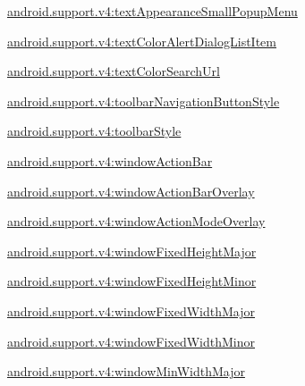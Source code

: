 {\ttfamily \hyperlink{classandroid_1_1support_1_1v4_1_1R_1_1styleable_a75e7751d6580449963f139fd3c4efd52}{android.\+support.\+v4\+:text\+Appearance\+Small\+Popup\+Menu}}

{\ttfamily \hyperlink{classandroid_1_1support_1_1v4_1_1R_1_1styleable_a635d1d4e8c44021e9a86c648aa1353ac}{android.\+support.\+v4\+:text\+Color\+Alert\+Dialog\+List\+Item}}

{\ttfamily \hyperlink{classandroid_1_1support_1_1v4_1_1R_1_1styleable_af247dbb00ad2d383e2bbe1ed27fd7304}{android.\+support.\+v4\+:text\+Color\+Search\+Url}}

{\ttfamily \hyperlink{classandroid_1_1support_1_1v4_1_1R_1_1styleable_aa8e0c46e553d29574374131334849630}{android.\+support.\+v4\+:toolbar\+Navigation\+Button\+Style}}

{\ttfamily \hyperlink{classandroid_1_1support_1_1v4_1_1R_1_1styleable_add96349c4e4f3a9c0e641cbdfe385992}{android.\+support.\+v4\+:toolbar\+Style}}

{\ttfamily \hyperlink{classandroid_1_1support_1_1v4_1_1R_1_1styleable_a13120c866ad32e1b4339a93a131463d6}{android.\+support.\+v4\+:window\+Action\+Bar}}

{\ttfamily \hyperlink{classandroid_1_1support_1_1v4_1_1R_1_1styleable_a35dd6a281168ca4263f3a47afa038b5a}{android.\+support.\+v4\+:window\+Action\+Bar\+Overlay}}

{\ttfamily \hyperlink{classandroid_1_1support_1_1v4_1_1R_1_1styleable_a90589f30809f60bc8783dde73bb5e9f1}{android.\+support.\+v4\+:window\+Action\+Mode\+Overlay}}

{\ttfamily \hyperlink{classandroid_1_1support_1_1v4_1_1R_1_1styleable_aaa685f805f4181374a8047b1ce8935b5}{android.\+support.\+v4\+:window\+Fixed\+Height\+Major}}

{\ttfamily \hyperlink{classandroid_1_1support_1_1v4_1_1R_1_1styleable_a8406ab28fcb798abe69bcc846a2e8a7d}{android.\+support.\+v4\+:window\+Fixed\+Height\+Minor}}

{\ttfamily \hyperlink{classandroid_1_1support_1_1v4_1_1R_1_1styleable_aeb98c393e76d842baf26189afd20c945}{android.\+support.\+v4\+:window\+Fixed\+Width\+Major}}

{\ttfamily \hyperlink{classandroid_1_1support_1_1v4_1_1R_1_1styleable_af5b499ea473560087fcc1a5241132837}{android.\+support.\+v4\+:window\+Fixed\+Width\+Minor}}

{\ttfamily \hyperlink{classandroid_1_1support_1_1v4_1_1R_1_1styleable_a5645adca1e8252ffeb1dc1c1480693b1}{android.\+support.\+v4\+:window\+Min\+Width\+Major}}

